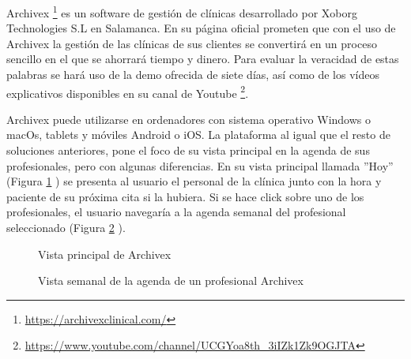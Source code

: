  Archivex \footnote{\url{https://archivexclinical.com/}} es un software de gestión de clínicas desarrollado por Xoborg Technologies S.L en Salamanca. En su página oficial prometen que con el uso de Archivex la gestión de las clínicas de sus clientes se convertirá en un proceso sencillo en el que se ahorrará tiempo y dinero. Para evaluar la veracidad de estas palabras se hará uso de la demo ofrecida de siete días, así como de los vídeos explicativos disponibles en su canal de Youtube \footnote{\url{https://www.youtube.com/channel/UCGYoa8th_3iIZk1Zk9OGJTA}}. \bigskip

Archivex puede utilizarse en ordenadores con sistema operativo Windows o macOs, tablets y móviles Android o iOS. La plataforma al igual que el resto de soluciones anteriores, pone el foco de su vista principal en la agenda de sus profesionales, pero con algunas diferencias. En su vista principal llamada ''Hoy'' (Figura \ref{fig:archivex-principal} ) se presenta al usuario el personal de la clínica junto con la hora y paciente de su próxima cita si la hubiera. Si se hace click sobre uno de los profesionales, el usuario navegaría a la agenda semanal del profesional seleccionado (Figura \ref{fig:archivex-agenda-profesional} ). 

\begin{figure}[H]
    \caption{Vista principal de Archivex}
    \label{fig:archivex-principal}
\end{figure}

\begin{figure}[H]
    \caption{Vista semanal de la agenda de un profesional Archivex}
    \label{fig:archivex-agenda-profesional}
\end{figure}

